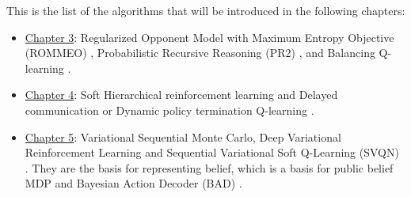 \label{sec:chap2-other-algos}
This is the list of the algorithms that will be introduced in the following chapters: 
\begin{itemize}
    \item \hyperref[chapter:chap3]{Chapter 3}: Regularized Opponent Model with Maximum Entropy Objective (ROMMEO) \cite{tian2019regularized}, Probabilistic Recursive Reasoning (PR2) \cite{wen2019probabilistic}, and Balancing Q-learning \cite{grau2018balancing}.
    \item \hyperref[chapter:chap4]{Chapter 4}: Soft Hierarchical reinforcement learning \cite{igl2019multitask, lobo2019soft} and Delayed communication or Dynamic policy termination Q-learning \cite{han2019multi}.
    \item \hyperref[chapter:chap5]{Chapter 5}: Variational Sequential Monte Carlo, Deep Variational Reinforcement Learning \cite{igl2018deep, shvechikovjoint} and Sequential Variational Soft Q-Learning (SVQN) \cite{huangsvqn}. They are the basis for representing belief, which is a basis for public belief MDP \cite{nayyar2013decentralized} and Bayesian Action Decoder (BAD) \cite{foerster2018bayesian}. 
\end{itemize}